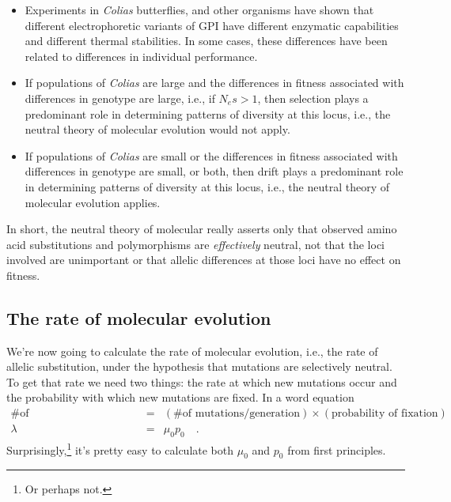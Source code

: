 \begin{itemize}
\begin{itemize}

\item Experiments in {\it Colias\/} butterflies, and other organisms
  have shown that different electrophoretic variants of GPI have
  different enzymatic capabilities and different thermal
  stabilities. In some cases, these differences have been related to
  differences in individual performance.

\item If populations of {\it Colias\/} are large and the differences
  in fitness associated with differences in genotype are large, i.e.,
  if $N_es > 1$, then selection plays a predominant role in
  determining patterns of diversity at this locus, i.e., the neutral
  theory of molecular evolution would not apply.

\item If populations of {\it Colias\/} are small or the differences in
  fitness associated with differences in genotype are small, or both,
  then drift plays a predominant role in determining patterns of
  diversity at this locus, i.e., the neutral theory of molecular
  evolution applies.

\end{itemize}

\end{itemize}

\noindent In short, the neutral theory of molecular really asserts
only that observed amino acid substitutions and polymorphisms are {\it
effectively\/} neutral, not that the loci involved are unimportant or
that allelic differences at those loci have no effect on
fitness.

\subsection*{The rate of molecular evolution}

We're now going to calculate the rate of molecular evolution, i.e.,
the rate of allelic substitution, under the hypothesis that mutations
are selectively neutral. To get that rate we need two things: the rate
at which new mutations occur and the probability with which new
mutations are fixed. In a word equation
\begin{eqnarray*}
\mbox{\# of substitutions/generation} &=& (\mbox{\# of mutations/generation})\times(\mbox{probability
  of fixation}) \\
\lambda &=& \mu_0p_0 \quad .
\end{eqnarray*}
Surprisingly,\footnote{Or perhaps not.} it's pretty easy to calculate
both $\mu_0$ and $p_0$ from first principles.

